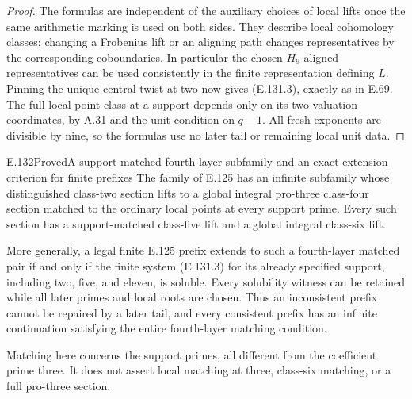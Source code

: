 \begin{proof}
The formulas are independent of the auxiliary choices
of local lifts once the same arithmetic marking is
used on both sides. They describe local cohomology
classes; changing a Frobenius lift or an aligning
path changes representatives by the corresponding
coboundaries. In particular the chosen \(H_9\)-aligned
representatives can be used consistently in the finite
representation defining \(L\).
Pinning the unique central twist at two now gives
(E.131.3), exactly as in E.69.
The full local point class at a support depends only
on its two valuation coordinates, by A.31 and the
unit condition on \(q-1\). All fresh exponents are
divisible by nine, so the formulas use no later tail
or remaining local unit data.
\end{proof}

\begin{result}{E.132}{Proved}{A support-matched fourth-layer subfamily and an exact extension criterion for finite prefixes}
The family of E.125 has an infinite subfamily whose
distinguished class-two section lifts to a global
integral pro-three class-four section matched to the
ordinary local points at every support prime.
Every such section has a support-matched class-five
lift and a global integral class-six lift.

More generally, a legal finite E.125 prefix extends
to such a fourth-layer matched pair if and only if
the finite system (E.131.3) for its already specified
support, including two, five, and eleven, is soluble.
Every solubility witness can be retained while all
later primes and local roots are chosen. Thus an
inconsistent prefix cannot be repaired by a later
tail, and every consistent prefix has an infinite
continuation satisfying the entire fourth-layer
matching condition.

Matching here concerns the support primes, all
different from the coefficient prime three.
It does not assert local matching at three,
class-six matching, or a full pro-three section.
\end{result}
